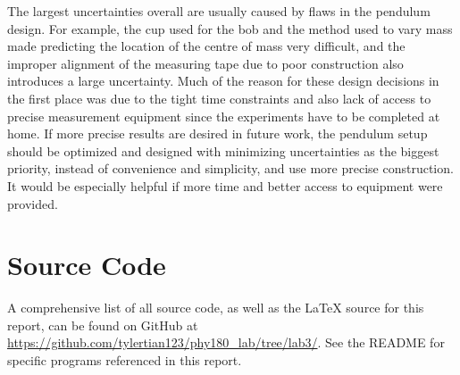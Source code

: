 \documentclass[aps,twocolumn,secnumarabic,nobalancelastpage,amsmath,amssymb,nofootinbib,floatfix,letterpaper]{revtex4}
\begin{document}
The largest uncertainties overall are usually caused by flaws in the pendulum design. For example, the cup used for the
bob and the method used to vary mass made predicting the location of the centre of mass very difficult, and the improper
alignment of the measuring tape due to poor construction also introduces a large uncertainty. Much of the reason for
these design decisions in the first place was due to the tight time constraints and also lack of access to precise
measurement equipment since the experiments have to be completed at home.
If more precise results are desired in future work, the pendulum setup should be optimized and designed with minimizing
uncertainties as the biggest priority, instead of convenience and simplicity, and use more precise construction. It
would be especially helpful if more time and better access to equipment were provided.


\appendix

\section{Source Code}

A comprehensive list of all source code, as well as the \LaTeX{} source for this report, can be found on GitHub at
\url{https://github.com/tylertian123/phy180_lab/tree/lab3/}. See the README for specific programs referenced in this
report.
\label{appendix:code}


\end{document}
